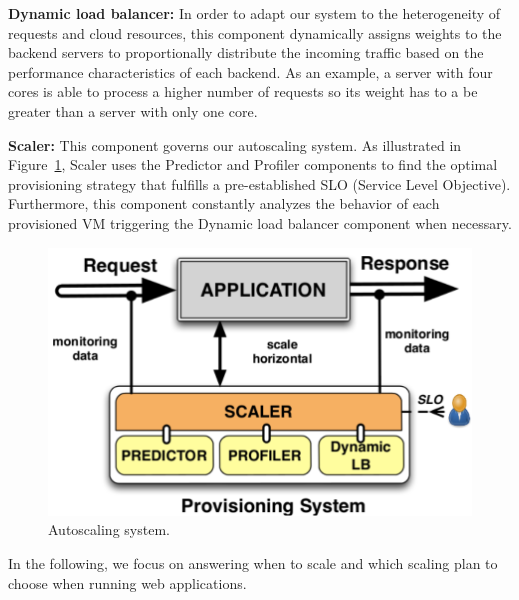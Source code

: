 
\vspace{2mm}

\textbf{Dynamic load balancer: } In order to adapt our system to the heterogeneity of requests and cloud resources, this component dynamically assigns weights to the backend servers to proportionally distribute the incoming traffic based on the performance characteristics of each backend. As an example, a server with four cores is able to process a higher number of requests so its weight has to a be greater than a server with only one core.

\vspace{2mm}

\textbf{Scaler:} This component governs our autoscaling system. As illustrated in Figure~\ref{autoScalingSys}, Scaler uses the Predictor and Profiler components to find the optimal provisioning strategy that fulfills a pre-established SLO (Service Level Objective). Furthermore, this component constantly analyzes the behavior of each provisioned VM triggering the Dynamic load balancer component when necessary.

\begin{figure}[htb]
  \begin{center}
    \includegraphics[width=.85\linewidth]{images/monitoringSchema}
  \end{center}
\vspace{-5mm}
  \caption{Autoscaling system.}
  \label{autoScalingSys}
\end{figure}

In the following, we focus on answering when to scale and which scaling plan to choose when running web applications.

